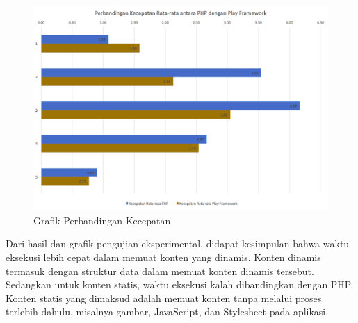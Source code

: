 \begin{figure}[H]
	\centering
	\includegraphics[scale=0.4]{Gambar/grafik-eksperimental}
	\caption{Grafik Perbandingan Kecepatan} 
	\label{fig:5_grafik_eksperimental}
\end{figure}

Dari hasil dan grafik pengujian eksperimental, didapat kesimpulan bahwa waktu eksekusi \play lebih cepat dalam memuat konten yang dinamis. Konten dinamis termasuk dengan struktur data dalam memuat konten dinamis tersebut. Sedangkan untuk konten statis, waktu eksekusi \play kalah dibandingkan dengan PHP. Konten statis yang dimaksud adalah memuat konten tanpa melalui proses terlebih dahulu, misalnya gambar, JavaScript, dan Stylesheet pada aplikasi.